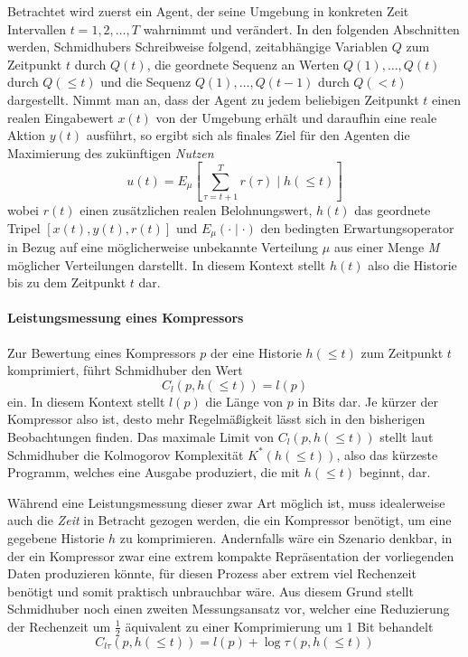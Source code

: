 Betrachtet wird zuerst ein Agent, der seine Umgebung in konkreten Zeit Intervallen \(t = 1,2, \dots ,T\) wahrnimmt und verändert. 
In den folgenden Abschnitten werden, Schmidhubers Schreibweise folgend, zeitabhängige Variablen \(Q\) zum Zeitpunkt \(t\) durch \(Q(t)\), die geordnete Sequenz an Werten \(Q(1), \dots,Q(t)\) durch \(Q(\leq t)\) und die Sequenz \(Q(1), \dots, Q(t-1)\) durch \(Q(<t)\) dargestellt.
Nimmt man an, dass der Agent zu jedem beliebigen Zeitpunkt \(t\) einen realen Eingabewert \(x(t)\) von der Umgebung erhält und daraufhin eine reale Aktion \(y(t)\) ausführt, so ergibt sich als finales Ziel für den Agenten die Maximierung des zukünftigen \emph{Nutzen} 
\begin{equation}
  u(t) = E_\mu \left[ \sum^T_{\tau=t+1} r(\tau) \mid h(\leq t)\right]  
\end{equation}
wobei \(r(t)\) einen zusätzlichen realen Belohnungswert, \(h(t)\) das geordnete Tripel \(\left[ x(t),y(t),r(t)\right]\) und \(E_\mu(\cdot \mid \cdot)\) den bedingten Erwartungsoperator in Bezug auf eine möglicherweise unbekannte Verteilung \(\mu\) aus einer Menge \emph{M} möglicher Verteilungen darstellt. \cite[p.~17]{curiosity_schmidhuber}
In diesem Kontext stellt \(h(t)\) also die Historie bis zu dem Zeitpunkt \(t\) dar.

\paragraph{Leistungsmessung eines Kompressors}
Zur Bewertung eines Kompressors \(p\) der eine Historie \(h(\leq t)\) zum Zeitpunkt \(t\) komprimiert, führt Schmidhuber den Wert 
\begin{equation}
  C_l(p,h(\leq t)) = l(p)  
\end{equation}
ein. In diesem Kontext stellt \(l(p)\) die Länge von \(p\) in Bits dar. Je kürzer der Kompressor also ist, desto mehr Regelmäßigkeit lässt sich in den bisherigen Beobachtungen finden. \cite[p.~19]{curiosity_schmidhuber}
Das maximale Limit von \(C_l(p,h(\leq t))\) stellt laut Schmidhuber die Kolmogorov Komplexität \(K^*(h(\leq t))\), also das kürzeste Programm, welches eine Ausgabe produziert, die mit \(h(\leq t)\) beginnt, dar.

Während eine Leistungsmessung dieser zwar Art möglich ist, muss idealerweise auch die \emph{Zeit} in Betracht gezogen werden, die ein Kompressor benötigt, um eine gegebene Historie \(h\) zu komprimieren. Andernfalls wäre ein Szenario denkbar, in der ein Kompressor zwar eine extrem kompakte Repräsentation der vorliegenden Daten produzieren könnte, für diesen Prozess aber extrem viel Rechenzeit benötigt und somit praktisch unbrauchbar wäre.
Aus diesem Grund stellt Schmidhuber noch einen zweiten Messungsansatz vor, welcher eine Reduzierung der Rechenzeit um \(\frac{1}{2}\) äquivalent zu einer Komprimierung um 1 Bit behandelt \cite[p.~19]{curiosity_schmidhuber}
\begin{equation}
  C_{l\tau}(p,h(\leq t)) = l(p) + \log \tau(p, h(\leq t))
\end{equation}

